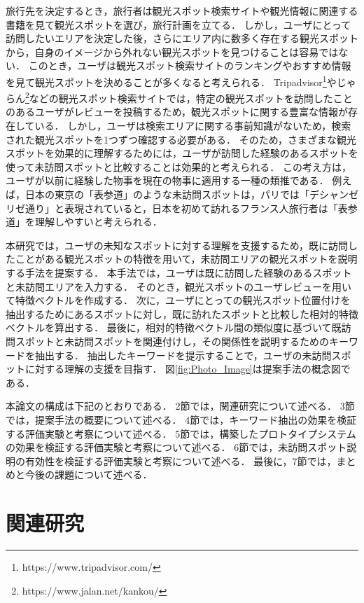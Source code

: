 \documentclass[submit]{ipsj}
\begin{document}
旅行先を決定するとき，旅行者は観光スポット検索サイトや観光情報に関連する書籍を見て観光スポットを選び，旅行計画を立てる．
しかし，ユーザにとって訪問したいエリアを決定した後，さらにエリア内に数多く存在する観光スポットから，自身のイメージから外れない観光スポットを見つけることは容易ではない．
このとき，ユーザは観光スポット検索サイトのランキングやおすすめ情報を見て観光スポットを決めることが多くなると考えられる．
Tripadvisor\footnote{https://www.tripadvisor.com/}やじゃらん\footnote{https://www.jalan.net/kankou/}などの観光スポット検索サイトでは，特定の観光スポットを訪問したことのあるユーザがレビューを投稿するため，観光スポットに関する豊富な情報が存在している．
しかし，ユーザは検索エリアに関する事前知識がないため，検索された観光スポットを1つずつ確認する必要がある．
そのため，さまざまな観光スポットを効果的に理解するためには，ユーザが訪問した経験のあるスポットを使って未訪問スポットと比較することは効果的と考えられる．
この考え方は，ユーザが以前に経験した物事を現在の物事に適用する一種の類推である．
例えば，日本の東京の「表参道」のような未訪問スポットは，パリでは「デシャンゼリゼ通り」と表現されていると，日本を初めて訪れるフランス人旅行者は「表参道」を理解しやすいと考えられる．

本研究では，ユーザの未知なスポットに対する理解を支援するため，既に訪問したことがある観光スポットの特徴を用いて，未訪問エリアの観光スポットを説明する手法を提案する．
本手法では，ユーザは既に訪問した経験のあるスポットと未訪問エリアを入力する．
そのとき，観光スポットのユーザレビューを用いて特徴ベクトルを作成する．
次に，ユーザにとっての観光スポット位置付けを抽出するためにあるスポットに対し，既に訪れたスポットと比較した相対的特徴ベクトルを算出する．
最後に，相対的特徴ベクトル間の類似度に基づいて既訪問スポットと未訪問スポットを関連付けし，その関係性を説明するためのキーワードを抽出する．
抽出したキーワードを提示することで，ユーザの未訪問スポットに対する理解の支援を目指す．
図\ref{fig:Photo_Image}は提案手法の概念図である．

本論文の構成は下記のとおりである．
2節では，関連研究について述べる．
3節では，提案手法の概要について述べる．
4節では，キーワード抽出の効果を検証する評価実験と考察について述べる．
5節では，構築したプロトタイプシステムの効果を検証する評価実験と考察について述べる．
6節では，未訪問スポット説明の有効性を検証する評価実験と考察について述べる．
最後に，7節では，まとめと今後の課題について述べる．


\section{関連研究}
\end{document}
